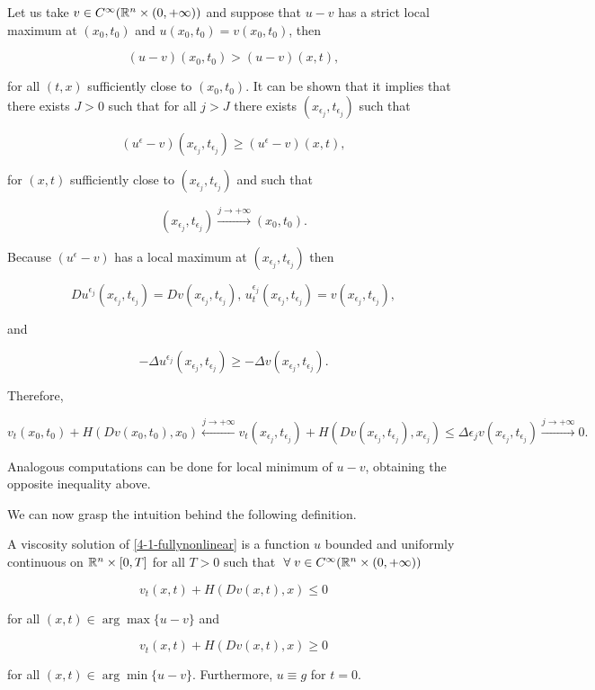 Let us take $v\in C^{\infty}(\mathbb{R}^n\times(0,+\infty))$ and suppose that $u-v$ has a strict local maximum at $(x_0,t_0)$ and $u(x_0,t_0) = v(x_0,t_0)$, then

\[(u-v)(x_0,t_0) > (u-v)(x,t),\]

for all $(t,x)$ sufficiently close to $(x_0,t_0)$. It can be shown that it implies that there exists $J>0$ such that for all 
$j>J$ there exists $(x_{\epsilon_j},t_{\epsilon_j})$ such that

\[(u^{\epsilon}-v)(x_{\epsilon_j},t_{\epsilon_j}) \geq (u^{\epsilon}-v)(x,t),\]

for $(x,t)$ sufficiently close to $(x_{\epsilon_j},t_{\epsilon_j})$ and such that

\[(x_{\epsilon_j},t_{\epsilon_j})\xrightarrow{j\to+\infty}(x_0,t_0).\]

Because $(u^{\epsilon}-v)$ has a local maximum at $(x_{\epsilon_j},t_{\epsilon_j})$ then

\[Du^{\epsilon_j}(x_{\epsilon_j},t_{\epsilon_j})=Dv(x_{\epsilon_j},t_{\epsilon_j}),\,u^{\epsilon_j}_t(x_{\epsilon_j},t_{\epsilon_j}) =v(x_{\epsilon_j},t_{\epsilon_j}),\]

and

\[-\Delta u^{\epsilon_j}(x_{\epsilon_j},t_{\epsilon_j}) \geq -\Delta v(x_{\epsilon_j},t_{\epsilon_j}).\]

Therefore,

\[v_t(x_0,t_0)+H(Dv(x_0,t_0),x_0)\xleftarrow{j\to+\infty}v_t(x_{\epsilon_j},t_{\epsilon_j}) +H(Dv(x_{\epsilon_j},t_{\epsilon_j}) ,x_{\epsilon_j})\leq \Delta \epsilon_jv(x_{\epsilon_j},t_{\epsilon_j}) \xrightarrow{j\to+\infty}0.\]

Analogous computations can be done for local minimum of $u-v$, obtaining the opposite inequality above.

We can now grasp the intuition behind the following definition.

\begin{definition}
    A viscosity solution of \ref{4-1-fullynonlinear} is a function $u$ bounded and uniformly continuous on $\mathbb{R}^n\times[0,T]$ for all $T>0$ such that $\forall v\in C^{\infty}(\R^n\times(0,+\infty))$

    \[v_t(x,t)+H(Dv(x,t),x)\leq0\]

    for all $(x,t)\in\arg \max\{u-v\}$ and

    \[v_t(x,t)+H(Dv(x,t),x)\geq0\]

    for all $(x,t)\in\arg \min\{u-v\}$. Furthermore, $u\equiv g$ for $t=0$. 
\end{definition}

